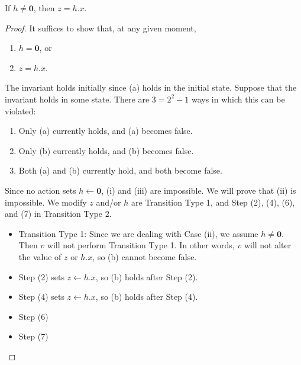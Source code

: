 \begin{thm}
    If $h \ne \textbf{0}$, then $z = h.x$.
\end{thm}

\begin{proof}
    It suffices to show that, at any given moment,
    \begin{enumerate}[label=(\alph*)]
        \item %
            $h = \textbf{0}$, or
        \item %
            $z = h.x$.
    \end{enumerate}
    The invariant holds initially since (a) holds in the initial state.
    Suppose that the invariant holds in some state.
    There are $3 = 2^2 - 1$ ways in which this can be violated:
    \begin{enumerate}[label=(\roman*)]
        \item  %
            Only (a) currently holds, and (a) becomes false.
        \item  %
            Only (b) currently holds, and (b) becomes false.
        \item  %
            Both (a) and (b) currently hold, and both become false.
    \end{enumerate}
    Since no action sets $h \leftarrow \textbf{0}$, (i) and (iii) are impossible.
    We will prove that (ii) is impossible.
    We modify $z$ and/or $h$ are Transition Type 1, and Step (2), (4), (6), and (7) in Transition Type 2.
    \begin{itemize}
        \item
            Transition Type 1: Since we are dealing with Case (ii), we assume $h \ne \textbf{0}$.
            Then $v$ will not perform Transition Type 1.
            In other words, $v$ will not alter the value of $z$ or $h.x$, so (b) cannot become false.
        \item
            Step (2) sets $z \leftarrow h.x$, so (b) holds after Step (2).
        \item
            Step (4) sets $z \leftarrow h.x$, so (b) holds after Step (4).
        \item
            Step (6)
        \item
            Step (7)
    \end{itemize}
\end{proof}

